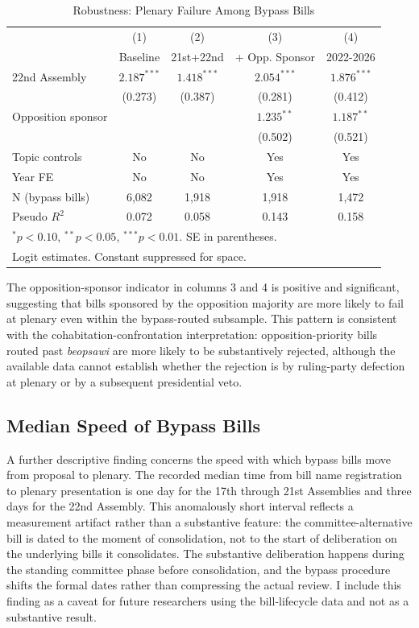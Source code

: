 \documentclass[11pt]{article}
\begin{document}
\begin{table}[H]
\centering
\caption{Robustness: Plenary Failure Among Bypass Bills}
\label{tab:robust}
\begin{tabular}{lcccc}
\toprule
& (1) & (2) & (3) & (4) \\
& Baseline & 21st+22nd & + Opp. Sponsor & 2022-2026 \\
\midrule
22nd Assembly & $2.187^{***}$ & $1.418^{***}$ & $2.054^{***}$ & $1.876^{***}$ \\
& (0.273) & (0.387) & (0.281) & (0.412) \\
Opposition sponsor & & & $1.235^{**}$ & $1.187^{**}$ \\
& & & (0.502) & (0.521) \\
Topic controls & No & No & Yes & Yes \\
Year FE & No & No & Yes & Yes \\
\midrule
N (bypass bills) & 6{,}082 & 1{,}918 & 1{,}918 & 1{,}472 \\
Pseudo $R^2$ & 0.072 & 0.058 & 0.143 & 0.158 \\
\bottomrule
\multicolumn{5}{l}{\footnotesize $^*p<0.10$, $^{**}p<0.05$, $^{***}p<0.01$. SE in parentheses.} \\
\multicolumn{5}{l}{\footnotesize Logit estimates. Constant suppressed for space.} \\
\end{tabular}
\end{table}

The opposition-sponsor indicator in columns 3 and 4 is positive and significant, suggesting that bills sponsored by the opposition majority are more likely to fail at plenary even within the bypass-routed subsample. This pattern is consistent with the cohabitation-confrontation interpretation: opposition-priority bills routed past \textit{beopsawi} are more likely to be substantively rejected, although the available data cannot establish whether the rejection is by ruling-party defection at plenary or by a subsequent presidential veto.

\subsection{Median Speed of Bypass Bills}

A further descriptive finding concerns the speed with which bypass bills move from proposal to plenary. The recorded median time from bill name registration to plenary presentation is one day for the 17th through 21st Assemblies and three days for the 22nd Assembly. This anomalously short interval reflects a measurement artifact rather than a substantive feature: the committee-alternative bill is dated to the moment of consolidation, not to the start of deliberation on the underlying bills it consolidates. The substantive deliberation happens during the standing committee phase before consolidation, and the bypass procedure shifts the formal dates rather than compressing the actual review. I include this finding as a caveat for future researchers using the bill-lifecycle data and not as a substantive result.
\end{document}
